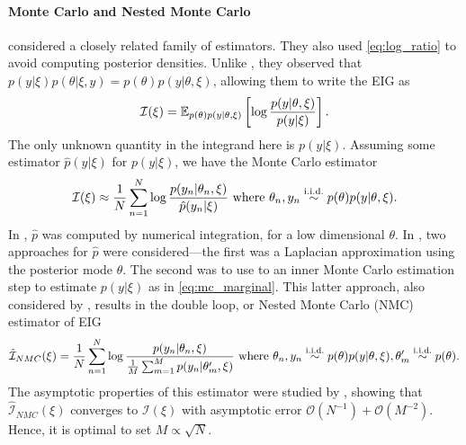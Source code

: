 \documentclass[a4paper, 10pt]{report}
\theoremstyle{plain}
\begin{document}
	\paragraph{Monte Carlo and Nested Monte Carlo} \citet{hamada2001finding,ryan2003estimating} considered a closely related family of estimators.
	They also used \eqref{eq:log_ratio} to avoid computing posterior densities.
	Unlike \citet{cook2008optimal,ryan2014towards}, they observed that $p(y|\xi)p(\theta|\xi,y) = p(\theta)p(y|\theta,\xi)$, allowing them to write the EIG as 
	\begin{equation}
	\mathcal{I}(\xi) = \mathbb{E}_{p(\theta)p(y|\theta,\xi)}\left[\log\frac{p(y|\theta,\xi)}{p(y|\xi)} \right].
	\end{equation}
	The only unknown quantity in the integrand here is $p(y|\xi)$. Assuming some estimator $\hat{p}(y|\xi)$ for $p(y|\xi)$, we have the Monte Carlo estimator
	\begin{equation}
	\mathcal{I}(\xi) \approx \frac{1}{N}\sum_{n=1}^N \log \frac{p(y_n|\theta_n,\xi)}{\hat{p}(y_n|\xi)} \text{ where } \theta_n,y_n \overset{\scriptstyle{\text{i.i.d.}}}{\sim} p(\theta)p(y|\theta,\xi).
	\end{equation}
	In \citet{hamada2001finding}, $\hat{p}$ was computed by numerical integration, for a low dimensional $\theta$.
	In \citet{ryan2003estimating}, two approaches for $\hat{p}$ were considered---the first was a Laplacian approximation using the posterior mode $\hat{\theta}$.
	The second was to use to an inner Monte Carlo estimation step to estimate $p(y|\xi)$ as in \eqref{eq:mc_marginal}.
	This latter approach, also considered by \citet{myung2013,rainforth2017thesis}, results in the double loop, or Nested Monte Carlo (NMC) estimator of EIG
	\begin{equation}
	\label{eq:nmc_estimator}
	\hat{\mathcal{I}}_{NMC}(\xi) = \frac{1}{N} \sum_{n=1}^N \log \frac{p(y_n|\theta_n,\xi)}{\frac{1}{M}\sum_{m=1}^M p(y_n|\theta'_m,\xi)} \text{ where } \theta_n,y_n \overset{\scriptstyle{\text{i.i.d.}}}{\sim} p(\theta)p(y|\theta,\xi),\theta'_m\overset{\scriptstyle{\text{i.i.d.}}}{\sim} p(\theta).
	\end{equation}
	The asymptotic properties of this estimator were studied by \citet{rainforth2018nesting,zheng2018robust,beck2018fast}, showing that $\hat{\mathcal{I}}_{NMC}(\xi)$ converges to $\mathcal{I}(\xi)$ with asymptotic error $\mathcal{O}(N^{-1}) + \mathcal{O}(M^{-2})$. Hence, it is optimal to set $M \propto \sqrt{N}$.
	
	
\end{document}
